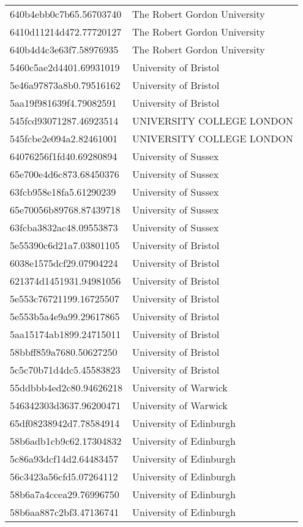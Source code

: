 \begin{tabular}{ll}
640b4ebb0c7b65.56703740 & The Robert Gordon University \\
6410d11214d472.77720127 & The Robert Gordon University \\
640b4d4c3e63f7.58976935 & The Robert Gordon University \\
5460c5ae2d4401.69931019 & University of Bristol \\
5e46a97873a8b0.79516162 & University of Bristol \\
5aa19f981639f4.79082591 & University of Bristol \\
545fcd93071287.46923514 & UNIVERSITY COLLEGE LONDON \\
545fcbe2e094a2.82461001 & UNIVERSITY COLLEGE LONDON \\
64076256f1fd40.69280894 & University of Sussex \\
65e700e4d6c873.68450376 & University of Sussex \\
63fcb958e18fa5.61290239 & University of Sussex \\
65e70056b89768.87439718 & University of Sussex \\
63fcba3832ac48.09553873 & University of Sussex \\
5e55390c6d21a7.03801105 & University of Bristol \\
6038e1575dcf29.07904224 & University of Bristol \\
621374d1451931.94981056 & University of Bristol \\
5e553c76721199.16725507 & University of Bristol \\
5e553b5a4e9a99.29617865 & University of Bristol \\
5aa15174ab1899.24715011 & University of Bristol \\
58bbff859a7680.50627250 & University of Bristol \\
5c5c70b71d4dc5.45583823 & University of Bristol \\
55ddbbb4ed2c80.94626218 & University of Warwick \\
546342303d3637.96200471 & University of Warwick \\
65df08238942d7.78584914 & University of Edinburgh \\
58b6adb1cb9c62.17304832 & University of Edinburgh \\
5c86a93dcf14d2.64483457 & University of Edinburgh \\
56c3423a56cfd5.07264112 & University of Edinburgh \\
58b6a7a4ccea29.76996750 & University of Edinburgh \\
58b6aa887c2bf3.47136741 & University of Edinburgh \\

\end{tabular}
